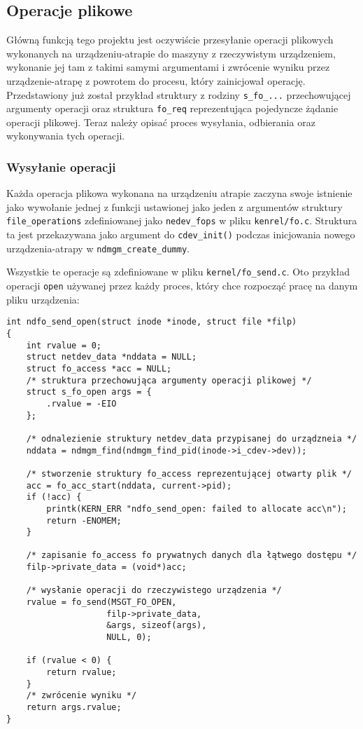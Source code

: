 \documentclass[10pt]{article}
\begin{document}
\subsection{Operacje plikowe}

Główną funkcją tego projektu jest oczywiście przesyłanie operacji plikowych wykonanych na urządzeniu-atrapie do maszyny z rzeczywistym urządzeniem, wykonanie jej tam z takimi samymi argumentami i zwrócenie wyniku przez urządzenie-atrapę z powrotem do procesu, który zainicjował operację. Przedstawiony już został przykład struktury z rodziny \texttt{s\_fo\_...} przechowującej argumenty operacji oraz struktura \texttt{fo\_req} reprezentująca pojedyncze żądanie operacji plikowej.  Teraz należy opisać proces wysyłania, odbierania oraz wykonywania tych operacji.

\subsubsection{Wysyłanie operacji}

Każda operacja plikowa wykonana na urządzeniu atrapie zaczyna swoje istnienie jako wywołanie jednej z funkcji ustawionej jako jeden z argumentów struktury \texttt{file\_operations} zdefiniowanej jako \texttt{nedev\_fops} w pliku \texttt{kenrel/fo.c}. Struktura ta jest przekazywana jako argument do \texttt{cdev\_init()} podczas inicjowania nowego urządzenia-atrapy w \texttt{ndmgm\_create\_dummy}.

Wszystkie te operacje są zdefiniowane w pliku \texttt{kernel/fo\_send.c}. Oto przykład operacji \texttt{open} używanej przez każdy proces, który chce rozpocząć pracę na danym pliku urządzenia:

\begin{verbatim}
int ndfo_send_open(struct inode *inode, struct file *filp)
{
    int rvalue = 0;
    struct netdev_data *nddata = NULL;
    struct fo_access *acc = NULL;
    /* struktura przechowująca argumenty operacji plikowej */
    struct s_fo_open args = {
        .rvalue = -EIO
    };

    /* odnalezienie struktury netdev_data przypisanej do urządzneia */
    nddata = ndmgm_find(ndmgm_find_pid(inode->i_cdev->dev));

    /* stworzenie struktury fo_access reprezentującej otwarty plik */
    acc = fo_acc_start(nddata, current->pid);
    if (!acc) {
        printk(KERN_ERR "ndfo_send_open: failed to allocate acc\n");
        return -ENOMEM;
    }

    /* zapisanie fo_access fo prywatnych danych dla łątwego dostępu */
    filp->private_data = (void*)acc;

    /* wysłanie operacji do rzeczywistego urządzenia */
    rvalue = fo_send(MSGT_FO_OPEN,
                    filp->private_data,
                    &args, sizeof(args),
                    NULL, 0);

    if (rvalue < 0) {
        return rvalue;
    }
    /* zwrócenie wyniku */
    return args.rvalue;
}
\end{verbatim}
\end{document}
